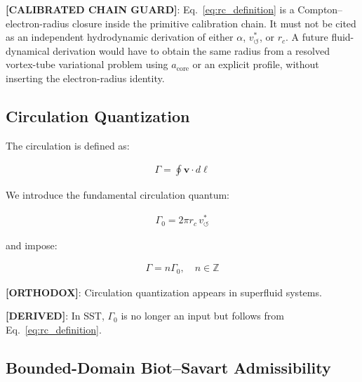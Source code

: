 \documentclass[11pt]{article}
\theoremstyle{definition}
\theoremstyle{plain}
\theoremstyle{remark}
\newcommand{\rc}{{r_c}}
\newcommand{\vchar}{v_{\!\boldsymbol{\circlearrowleft}}^{\ast}}
\begin{document}
        \textbf{[CALIBRATED CHAIN GUARD]}: Eq.~\eqref{eq:rc_definition} is a Compton--electron-radius closure inside the primitive calibration chain. It must not be cited as an independent hydrodynamic derivation of either $\alpha$, $\vchar$, or $\rc$. A future fluid-dynamical derivation would have to obtain the same radius from a resolved vortex-tube variational problem using $a_{\mathrm{core}}$ or an explicit profile, without inserting the electron-radius identity.
    
    \subsection{Circulation Quantization}
        
        The circulation is defined as:
        
        \begin{align}
            \Gamma = \oint \mathbf{v} \cdot d\ell
        \end{align}
        
        We introduce the fundamental circulation quantum:
        
        \begin{align}
            \Gamma_0 = 2\pi \rc \, \vchar
            \label{eq:gamma0}
        \end{align}
        
        and impose:
        
        \begin{align}
            \Gamma = n \Gamma_0, \quad n \in \mathbb{Z}
        \end{align}
        
        \textbf{[ORTHODOX]}: Circulation quantization appears in superfluid systems.
        
        \textbf{[DERIVED]}: In SST, $\Gamma_0$ is no longer an input but follows from Eq.~\ref{eq:rc_definition}.
    
\subsection{Bounded-Domain Biot--Savart Admissibility}
        \label{subsec:bounded_domain_biot_savart}
\end{document}

